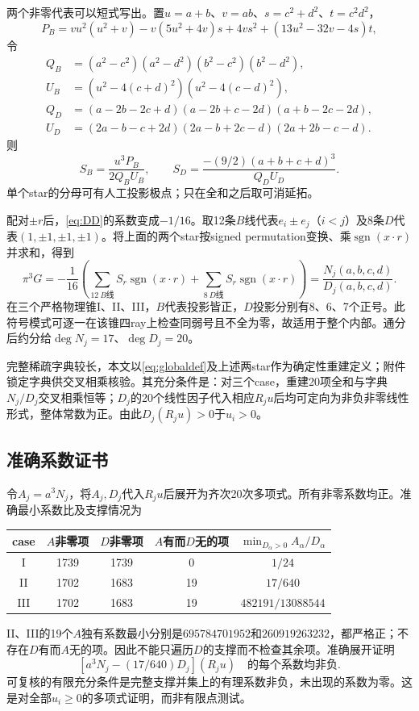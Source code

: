 \documentclass[UTF8,11pt,a4paper,fontset=fandol]{ctexart}
\theoremstyle{remark}\newtheorem{remark}[theorem]{注}
\newcommand{\1}{\mathbf1}\newcommand{\pos}[1]{(#1)_+}
\DeclareMathOperator{\sgn}{sgn}\DeclareMathOperator{\rank}{rank}
\begin{document}
两个非零代表可以短式写出。置$u=a+b$、$v=ab$、$s=c^2+d^2$、$t=c^2d^2$，
\[
 P_B=vu^2(u^2+v)-v(5u^2+4v)s+4vs^2+(13u^2-32v-4s)t,
\]
令
\begin{align*}
 Q_B&=(a^2-c^2)(a^2-d^2)(b^2-c^2)(b^2-d^2),\\
 U_B&=(u^2-4(c+d)^2)(u^2-4(c-d)^2),\\
 Q_D&=(a-2b-2c+d)(a-2b+c-2d)(a+b-2c-2d),\\
 U_D&=(2a-b-c+2d)(2a-b+2c-d)(2a+2b-c-d).
\end{align*}
则
\[
 S_B=\frac{u^3P_B}{2Q_BU_B},\qquad
 S_D=\frac{-(9/2)(a+b+c+d)^3}{Q_DU_D}.
\]
单个star的分母可有人工投影极点；只在全和之后取可消延拓。

配对$\pm r$后，\eqref{eq:DD}的系数变成$-1/16$。取12条$B$线代表$e_i\pm e_j$（$i<j$）及8条$D$代表$(1,\pm1,\pm1,\pm1)$。将上面的两个star按signed permutation变换、乘$\sgn(x\cdot r)$并求和，得到
\begin{equation}\label{eq:globaldef}
 \pi^3G=-\frac1{16}\left(\sum_{12\ B\text{线}}S_r\sgn(x\cdot r)
 +\sum_{8\ D\text{线}}S_r\sgn(x\cdot r)\right)
 =\frac{N_j(a,b,c,d)}{D_j(a,b,c,d)}.
\end{equation}
在三个严格物理锥I、II、III，$B$代表投影皆正，$D$投影分别有8、6、7个正号。此符号模式可逐一在该锥四ray上检查同弱号且不全为零，故适用于整个内部。通分后约分给$\deg N_j=17$、$\deg D_j=20$。

完整稀疏字典较长，本文以\eqref{eq:globaldef}及上述两star作为确定性重建定义；附件锁定字典供交叉相乘核验。其充分条件是：对三个case，重建20项全和与字典$N_j/D_j$交叉相乘恒等；$D_j$的20个线性因子代入相应$R_ju$后均可定向为非负非零线性形式，整体常数为正。由此$D_j(R_ju)>0$于$u_i>0$。

\subsection{准确系数证书}
令$A_j=a^3N_j$，将$A_j,D_j$代入$R_ju$后展开为齐次20次多项式。所有非零系数均正。准确最小系数比及支撑情况为
\begin{center}
\begin{tabular}{ccccc}\toprule
case&$A$非零项&$D$非零项&$A$有而$D$无的项&$\min_{D_\alpha>0}A_\alpha/D_\alpha$\\\midrule
I&1739&1739&0&$1/24$\\
II&1702&1683&19&$17/640$\\
III&1702&1683&19&$482191/13088544$\\\bottomrule
\end{tabular}
\end{center}
II、III的19个$A$独有系数最小分别是$695784701952$和$260919263232$，都严格正；不存在$D$有而$A$无的项。因此不能只遍历$D$的支撑而不检查其余项。准确展开证明
\begin{equation}\label{eq:minpoly}
 [a^3N_j-(17/640)D_j](R_ju)
 \quad\text{的每个系数均非负}.
\end{equation}
可复核的有限充分条件是完整支撑并集上的有理系数非负，未出现的系数为零。这是对全部$u_i\ge0$的多项式证明，而非有限点测试。
\end{document}
